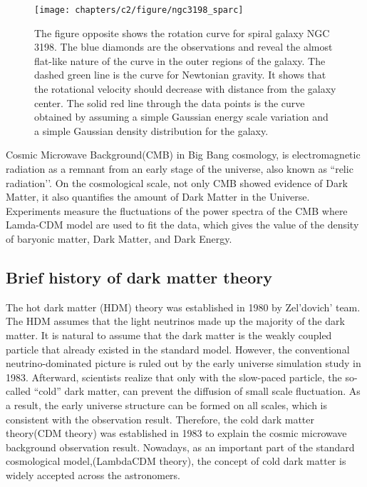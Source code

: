    \begin{figure}[htbp]
    \begin{center}
      \texttt{[image: chapters/c2/figure/ngc3198\_sparc]}
    \end{center}
    \caption{The figure opposite shows the rotation curve for spiral galaxy NGC 3198. The blue diamonds are the observations and reveal the almost flat-like nature of the curve in the outer regions of the galaxy. The dashed green line is the curve for Newtonian gravity. It shows that the rotational velocity should decrease with distance from the galaxy center. The solid red line through the data points is the curve obtained by assuming a simple Gaussian energy scale variation and a simple Gaussian density distribution for the galaxy. 
 }
    \label{fig:rotation}
  \end{figure}
 	
	
Cosmic Microwave Background(CMB)  in Big Bang cosmology, is electromagnetic radiation as a remnant from an early stage of the universe, also known as ``relic radiation’’. 
On the cosmological scale, not only CMB showed evidence of Dark Matter, it also quantifies the amount of Dark Matter in the Universe.
Experiments measure the fluctuations of the power spectra of the CMB where Lamda-CDM model are used to  fit the data, which gives the value of the density of baryonic matter, Dark Matter, and Dark Energy.
	

\subsection{Brief history of dark matter theory}
The hot dark matter (HDM) theory\cite{Zeldovich:1982zz} was established in 1980 by Zel’dovich’ team.
 The HDM assumes that the light neutrinos made up the majority of the dark matter. 
It is natural to assume that the dark matter is the weakly coupled particle that already existed in the standard model. 
However, the conventional neutrino-dominated picture is ruled out by the early universe simulation study in 1983. \cite{White:1984yj} 
Afterward, scientists realize that only with the slow-paced particle, the so-called ``cold'' dark matter, can prevent the diffusion of small scale fluctuation. 
As a result, the early universe structure can be formed on all scales, which is consistent with the observation result. 
Therefore, the cold dark matter theory(CDM theory)\cite{PhysRevLett.48.223} was established in 1983 to explain the cosmic microwave background observation result.
 Nowadays, as an important part of the standard cosmological model,(LambdaCDM theory), the concept of cold dark matter is widely accepted across the astronomers. 

